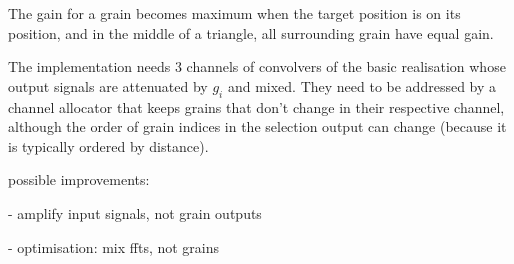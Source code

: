 The gain for a grain becomes maximum when the target position is on its position, and in the middle of a triangle, all surrounding grain have equal gain.

The implementation needs 3 channels of convolvers of the basic realisation whose output signals are attenuated by $g_i$ and mixed.  They need to be addressed by a channel allocator that keeps grains that don't change in their respective channel, although the order of grain indices in the selection output can change (because it is typically ordered by distance).

possible improvements:

- amplify input signals, not grain outputs

- optimisation: mix ffts, not grains